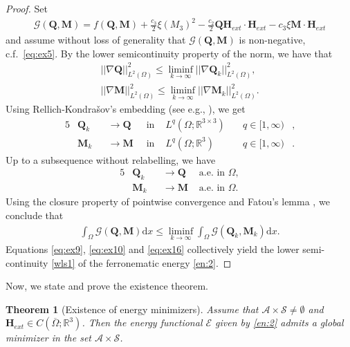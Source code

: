 \documentclass{article}
\newtheorem{theorem}{Theorem}[section]
\def\Qvec{\mathbf{Q}}
\def \Mvec{\mathbf{M}}
\def\Hvec{\mathbf{H}}
\def\d{\mathrm{d}}
\begin{document}
\begin{proof}
Set 
\begin{eqnarray}
\mathcal{G}\left(\Qvec,\Mvec\right)
=f\left(\Qvec, \Mvec\right)+ \frac{c_3}{2}\xi\left(M_3\right)^2 - \frac{c_2}{2}\Qvec\Hvec_{ext}\cdot\Hvec_{ext} - c_3\xi\Mvec\cdot\Hvec_{ext}\nonumber
\end{eqnarray} 
and assume without loss of generality that $\mathcal{G}\left(\Qvec,\Mvec\right)$ is non-negative, c.f.\ \eqref{eq:ex5}.
By the lower semicontinuity property of the norm, we have that
\begin{eqnarray}
||\nabla \Qvec||^2_{L^2\left(\Omega \right)} \le  \liminf_{k\rightarrow\infty}||\nabla \Qvec_k||^2_{L^2\left(\Omega\right)},\label{eq:ex9}\\
||\nabla \Mvec||^2_{L^2\left(\Omega\right)}\le  \liminf_{k\rightarrow\infty}||\nabla \Mvec_k||^2_{L^2\left(\Omega\right)}. \label{eq:ex10}
\end{eqnarray}
Using Rellich-Kondra\v{s}ov's embedding (see e.g., \cite[Theorem 6.1-5]{ciarlet2021mathematical}), we get   
\begin{alignat}{5}
&\Qvec_k& &\rightarrow\Qvec &~\mbox{ in }& L^q\left(\Omega;\mathbb R^{3\times 3}\right) &\quad q\in [1, \infty)&,\\
&\Mvec_k& &\rightarrow\Mvec &~\mbox{ in }& L^q\left(\Omega;\mathbb R^3\right) &\quad q\in [1, \infty)&.
\end{alignat}\label{eq:ex12}
Up to a subsequence without relabelling, we have
\begin{alignat}{5}
&\Qvec_k& &\rightarrow \Qvec& \mbox{ a.e. in } \Omega,\label{eq:ex13}\\
&\Mvec_k& &\rightarrow \Mvec& \mbox{ a.e. in } \Omega.\label{eq:ex14}
\end{alignat}
Using the closure property of pointwise convergence and Fatou's lemma \cite{Rindler}, we conclude that
\begin{eqnarray}
\int_{\Omega}\mathcal{G}\left(\Qvec,\Mvec\right)\d x\le\liminf_{k\rightarrow\infty}\int_{\Omega}\mathcal{G}\left(\Qvec_k,\Mvec_k\right)\d x.\label{eq:ex16}
\end{eqnarray}
Equations \eqref{eq:ex9}, \eqref{eq:ex10} and \eqref{eq:ex16} collectively yield the lower semi-continuity \eqref{wls1} of the ferronematic energy \eqref{en:2}. 
\end{proof}
Now, we state and prove the existence theorem.
\begin{theorem}[Existence of energy minimizers]\label{thm:1}
Assume that $\mathcal{A}\times\mathcal{S}\ne\emptyset$ and $\Hvec_{ext}\in C\left(\overline{\Omega}; \mathbb R^3\right)$. Then the energy functional $\mathcal{E}$ given by \eqref{en:2} admits a global minimizer in the set $\mathcal{A}\times\mathcal{S}$.
\end{theorem}
\end{document}
